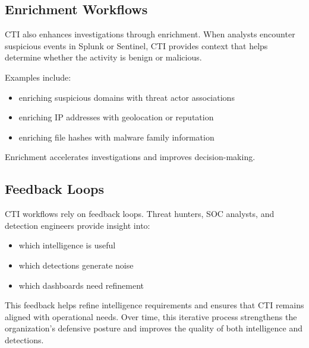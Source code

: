 
\subsection*{Enrichment Workflows}

CTI also enhances investigations through enrichment. When analysts encounter suspicious events in Splunk or Sentinel, 
CTI provides context that helps determine whether the activity is benign or malicious.

Examples include:

\begin{itemize}
    \item enriching suspicious domains with threat actor associations
    \item enriching IP addresses with geolocation or reputation
    \item enriching file hashes with malware family information
\end{itemize}

Enrichment accelerates investigations and improves decision-making.


\subsection*{Feedback Loops}

CTI workflows rely on feedback loops. Threat hunters, SOC analysts, and detection engineers provide insight into:

\begin{itemize}
    \item which intelligence is useful
    \item which detections generate noise
    \item which dashboards need refinement
\end{itemize}

This feedback helps refine intelligence requirements and ensures that CTI remains aligned with operational needs. 
Over time, this iterative process strengthens the organization’s defensive posture and improves the quality of both 
intelligence and detections.

